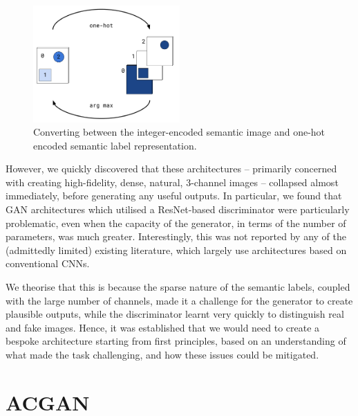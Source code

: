 \begin{figure}[h]
    \centering
    \includegraphics[width=0.5\textwidth]{labels/figs/label-semantics.pdf}
    \caption{Converting between the integer-encoded semantic image and one-hot encoded semantic label representation.}
    \label{fig:semantic_label}
\end{figure}

However, we quickly discovered that these architectures -- primarily concerned with creating high-fidelity, dense, natural, 3-channel images -- collapsed almost immediately, before generating any useful outputs.
In particular, we found that GAN architectures which utilised a ResNet-based discriminator were particularly problematic, even when the capacity of the generator, in terms of the number of parameters, was much greater.
Interestingly, this was not reported by any of the (admittedly limited) existing literature, which largely use architectures based on conventional CNNs.

We theorise that this is because the sparse nature of the semantic labels, coupled with the large number of channels, made it a challenge for the generator to create plausible outputs, while the discriminator learnt very quickly to distinguish real and fake images.
Hence, it was established that we would need to create a bespoke architecture starting from first principles, based on an understanding of what made the task challenging, and how these issues could be mitigated.

\section{ACGAN}

